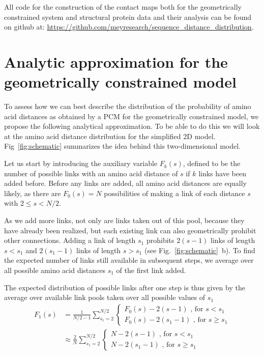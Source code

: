 \documentclass[
reprint,
twocolumn,
amsmath,amssymb,superscriptaddress,aps,
pre]{revtex4-1}
\newcommand{\red}[1]{\textcolor{red!80!black}{#1}}
\begin{document}
All code for the construction of the contact maps both for the geometrically constrained system and structural protein data and their analysis can be found on github at: \url{https://github.com/meyresearch/sequence_distance_distribution}.



\section{Analytic approximation for the geometrically constrained model}

To assess how we can best describe the distribution of the probability of amino acid distances as obtained by a PCM for the geometrically constrained model, we propose the following analytical approximation. To be able to do this we will look at the amino acid distance distribution for the simplified 2D model. Fig~\ref{fig:schematic} summarizes the idea behind this two-dimensional model.

Let us start by introducing the auxiliary variable $F_k(s)$, defined to be the number of possible links with an amino acid distance of $s$ if $k$ links have been added before. Before any links are added, all amino acid distances are equally likely, as there are $F_0(s)=N$ possibilities of making a link of each distance $s$ with $2\leq s < N/2$.

As we add more links, not only are links taken out of this pool, because they have already been realized, \red{but} each existing link can also geometrically prohibit other connections. Adding a link of length $s_1$ prohibits $2(s-1)$ links of length $s<s_1$ and $2(s_1-1)$ links of length $s>s_1$ (see Fig.~\ref{fig:schematic}~b). To find the expected number of links still available in subsequent steps, we average over all possible amino acid distances $s_1$ of the first link added.

The expected distribution of possible links after one step is \red{thus given} by the average over available link pools taken over all possible values of $s_1$
\begin{equation}
\begin{aligned}
    F_1(s)&=\frac{1}{N/2-1} \sum_{s_1=2}^{N/2}{ \begin{cases}
    F_0(s)-2(s-1) \text{ , for } s<s_1\\
    F_0(s)-2(s_1 -1)\text{ , for } s\geq s_1
    \end{cases}}
    \nonumber \\
    &\approx\frac{2}{N} \sum_{s_1=2}^{N/2} { \begin{cases}
    N-2(s-1) \text{ , for } s<s_1\\
    N-2(s_1 -1)\text{ , for } s\geq s_1
    \end{cases}}
\end{aligned}
    \label{eq:reduction_first_step}
\end{equation}
\end{document}

